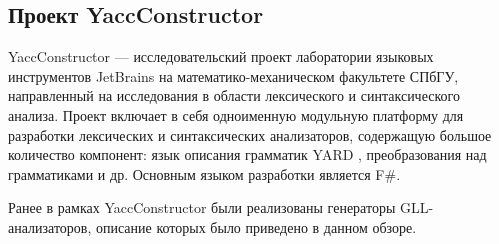 \subsection{Проект YaccConstructor}

YaccConstructor \cite{SemyonPhD} --- исследовательский проект лаборатории языковых инструментов JetBrains на математико-механическом факультете СПбГУ, направленный на исследования в области лексического и синтаксического анализа. Проект включает в себя одноименную модульную платформу для разработки лексических и синтаксических анализаторов, содержащую большое количество компонент: язык описания грамматик YARD \cite{yard_url}, преобразования над грамматиками и др. Основным языком разработки является F$\#$.

Ранее в рамках YaccConstructor были реализованы генераторы GLL-анализаторов, описание которых было приведено в данном обзоре. 

